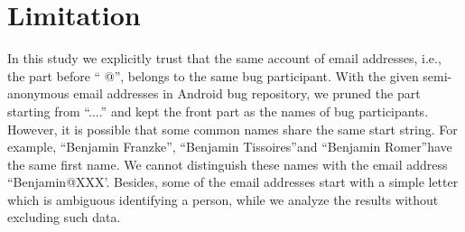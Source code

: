 \documentclass[conference]{IEEEtran}
\begin{document}


%
%





\section{Limitation}
\label{limitation}

In this study we explicitly trust that the same account of email
addresses, i.e., the part before \textquotedblleft
@\textquotedblright, belongs to the same bug participant. With the
given semi-anonymous email addresses in Android bug repository, we
pruned the part starting from \textquotedblleft ....\textquotedblright
and kept the front part as the names of bug participants. However, it
is possible that some common names share the same start string. For
example, \textquotedblleft Benjamin Franzke\textquotedblright,
\textquotedblleft Benjamin Tissoires\textquotedblright  and
\textquotedblleft Benjamin Romer\textquotedblright  have the same
first name. We cannot distinguish these names with the email address
\textquotedblleft Benjamin@XXX'. Besides, some of the email addresses
start with a simple letter which is ambiguous identifying a person,
while we analyze the results without excluding such data.
\end{document}
